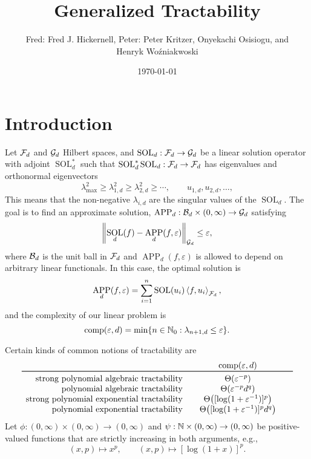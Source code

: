 \documentclass[11pt,a4paper]{article}
\DeclareMathOperator{\SOL}{SOL}
\DeclareMathOperator{\APP}{APP}
\newcommand{\fred}[1]{\begingroup\color{blue}Fred: #1\endgroup}
\newcommand{\peter}[1]{\begingroup\color{purple}Peter: #1\endgroup}
\newcommand{\kachi}[1]{\begingroup\color{ForestGreen}#1\endgroup}
\begin{document}
\newtheorem{theorem}{Theorem}
\theoremstyle{definition}
\newtheorem{definition}{Definition}


\title{Generalized Tractability}
\author{\fred{Fred J. Hickernell}, \peter{Peter Kritzer}, \kachi{Onyekachi Osisiogu}, and \\ Henryk Wo\'zniakwoski}
\date{\today}

\maketitle

\section{Introduction}

Let $\mathcal{F}_d$ and $\mathcal{G}_d$ Hilbert spaces, and $\SOL_d : \cf_d \to \cg_d$ be a linear solution operator with adjoint $\SOL_d^*$ such that $\SOL_d^*\SOL_d : \cf_d \to \cf_d$ has eigenvalues and orthonormal eigenvectors  
\[
\lambda_{\max}^2 \ge \lambda_{1,d}^2 \ge \lambda_{2,d}^2 \ge \cdots, \qquad u_{1,d}, u_{2,d}, \ldots, 
\]
This means that the non-negative $\lambda_{i,d}$ are the singular values of the $\SOL_d$. The goal is to find an approximate solution, $\APP_d:\cb_d \times (0,\infty) \to \cg_d$ satisfying 
\[
\norm[\cg_d]{\SOL_d(f) - \APP_d(f,\varepsilon)} \le \varepsilon,
\]
where $\mathcal{B}_d$ is the unit ball in $\mathcal{F}_d$ and $\APP_d(f,\varepsilon)$ is allowed to depend on arbitrary linear functionals.  In this case, the optimal solution is 
\[
\APP_d(f,\varepsilon) = \sum_{i=1}^n \SOL(u_i) \ip[\cf_d]{f}{u_i},
\]
and the complexity of our linear problem is
\[
\operatorname{comp}(\varepsilon, d) = \min \{n \in \mathbb{N}_{0} : \lambda_{n+1, d} \le \varepsilon\}.
\]

Certain kinds of common notions of tractability are 
\begin{equation*}
    \begin{array}{r@{\qquad}c@{\qquad}c}
    & \comp(\varepsilon, d)\\
    \toprule
    \text{strong polynomial algebraic  tractability} & \Theta(\varepsilon^{-p})\\
    \text{polynomial algebraic tractability} & \Theta(\varepsilon^{-p}d^{q})\\
    \text{strong polynomial exponential tractability} &  \Theta\bigl([\log(1 + \varepsilon^{-1})]^p\bigr)\\
    \text{polynomial exponential tractability} & \Theta\bigl([\log(1 + \varepsilon^{-1})]^p  d^{q}\bigr)
    \end{array}
\end{equation*}
Let $\phi : (0,\infty) \times (0,\infty) \to (0,\infty)$ and $\psi : \mathbb{N}  \times (0,\infty) \to (0,\infty)$ be positive-valued functions that are strictly increasing in both arguments, e.g., 
\[
(x,p) \mapsto x^{p}, \qquad (x,p) \mapsto [\log(1+x)]^p.
\]
\end{document}
